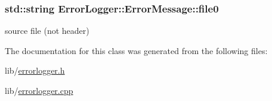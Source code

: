 \hypertarget{class_error_logger_1_1_error_message_a7efa13ab9225aee1b195f878268e0ea6}{
\subsubsection[{file0}]{\setlength{\rightskip}{0pt plus 5cm}std\-::string Error\-Logger\-::\-Error\-Message\-::file0}}\label{class_error_logger_1_1_error_message_a7efa13ab9225aee1b195f878268e0ea6}
source file (not header) 

The documentation for this class was generated from the following files\-:\begin{DoxyCompactItemize}
\item 
lib/\hyperlink{errorlogger_8h}{errorlogger.\-h}\item 
lib/\hyperlink{errorlogger_8cpp}{errorlogger.\-cpp}\end{DoxyCompactItemize}
